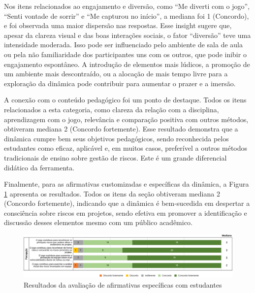 \documentclass[
	12pt,
	openright,
	twoside,
	a4paper,
	english,
	brazil
	]{abntex2}
\begin{document}
Nos itens relacionados ao engajamento e diversão, como  “Me diverti com o jogo”,  “Senti vontade de sorrir” e  “Me capturou no início”, a mediana foi 1 (Concordo), e foi observada uma maior dispersão nas respostas. Esse insight sugere que, apesar da clareza visual e das boas interações sociais, o fator  “diversão” teve uma intensidade moderada. Isso pode ser influenciado pelo ambiente de sala de aula ou pela não familiaridade dos participantes uns com os outros, que pode inibir o engajamento espontâneo. A introdução de elementos mais lúdicos, a promoção de um ambiente mais descontraído, ou a alocação de mais tempo livre para a exploração da dinâmica pode contribuir para aumentar o prazer e a imersão.

A conexão com o conteúdo pedagógico foi um ponto de destaque. Todos os itens relacionados a esta categoria, como clareza da relação com a disciplina, aprendizagem com o jogo, relevância e comparação positiva com outros métodos, obtiveram mediana 2 (Concordo fortemente). Esse resultado demonstra que a dinâmica cumpre bem seus objetivos pedagógicos, sendo reconhecida pelos estudantes como eficaz, aplicável e, em muitos casos, preferível a outros métodos tradicionais de ensino sobre gestão de riscos. Este é um grande diferencial didático da ferramenta.

Finalmente, para as afirmativas customizadas e específicas da dinâmica, a Figura \ref{ufsc-afirmativas} apresenta os resultados. Todos os itens da seção obtiveram mediana 2 (Concordo fortemente), indicando que a dinâmica é bem-sucedida em despertar a consciência sobre riscos em projetos, sendo efetiva em promover a identificação e discussão desses elementos mesmo com um público acadêmico.

\begin{figure}[H]
	\caption{\label{ufsc-afirmativas} Resultados da avaliação de afirmativas específicas com estudantes}
  \includegraphics[width=\textwidth]{ufsc-afirmativas}
\end{figure}
\end{document}
